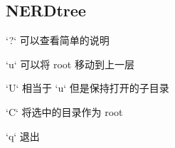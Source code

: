 \subsection{NERDtree}
\item `?` 可以查看简单的说明
\item `u` 可以将 root 移动到上一层
\item `U` 相当于 `u` 但是保持打开的子目录
\item `C` 将选中的目录作为 root
\item `q` 退出
